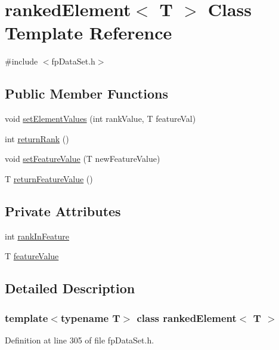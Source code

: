 \hypertarget{classrankedElement}{}\section{ranked\+Element$<$ T $>$ Class Template Reference}
\label{classrankedElement}


{\ttfamily \#include $<$fp\+Data\+Set.\+h$>$}

\subsection*{Public Member Functions}
\begin{DoxyCompactItemize}
\item 
void \hyperlink{classrankedElement_a9e4dc03750c4c7c228d3366aa5f9b6e5}{set\+Element\+Values} (int rank\+Value, T feature\+Val)
\item 
int \hyperlink{classrankedElement_a1de90c49ea4143986f5fc9b197758518}{return\+Rank} ()
\item 
void \hyperlink{classrankedElement_a94d4033db01ce1259a689e45f8f0d859}{set\+Feature\+Value} (T new\+Feature\+Value)
\item 
T \hyperlink{classrankedElement_ab49ad201b4452d0ec63f850f3eec26cc}{return\+Feature\+Value} ()
\end{DoxyCompactItemize}
\subsection*{Private Attributes}
\begin{DoxyCompactItemize}
\item 
int \hyperlink{classrankedElement_a419244fe97e0bace27a3cb7db7639e1c}{rank\+In\+Feature}
\item 
T \hyperlink{classrankedElement_a710e6e4cc93b791e5cd1fd21716be2e9}{feature\+Value}
\end{DoxyCompactItemize}


\subsection{Detailed Description}
\subsubsection*{template$<$typename T$>$\newline
class ranked\+Element$<$ T $>$}



Definition at line 305 of file fp\+Data\+Set.\+h.



